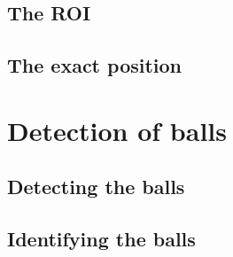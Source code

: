 	\subsection{The ROI}
		
	\subsection{The exact  position}
		


\section{Detection of balls}
	\subsection{Detecting the balls}
		

	\subsection{Identifying the balls}
		







